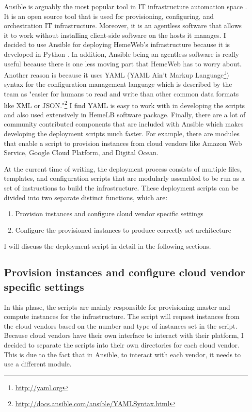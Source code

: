 Ansible is arguably the most popular tool in IT infrastructure automation space \citep{mohaan2014learning}. It is an open source tool that is used for provisioning, configuring, and orchestration IT infrastructure. Moreover, it is an agentless software that allows it to work without installing client-side software on the hosts it manages. I decided to use Ansible for deploying HemeWeb's infrastructure because it is developed in Python \citep{mohaan2014learning}. In addition, Ansible being an agentless software is really useful because there is one less moving part that HemeWeb has to worry about. Another reason is because it uses YAML (YAML Ain't Markup Language\footnote{\url{http://yaml.org}}) syntax for the configuration management language which is described by the team as "easier for humans to read and write than other common data formats like XML or JSON."\footnote{\url{http://docs.ansible.com/ansible/YAMLSyntax.html}} I find YAML is easy to work with in developing the scripts and also used extensively in HemeLB software package.  Finally, there are a lot of community contributed components that are included with Ansible which makes developing the deployment scripts much faster. For example, there are modules that enable a script to provision instances from cloud vendors like Amazon Web Service, Google Cloud Platform, and Digital Ocean.  




At the current time of writing, the deployment process consists of multiple files, templates, and configuration scripts that are modularly assembled to be run as a set of instructions to build the infrastructure. These deployment scripts can be divided into two separate distinct functions, which are:

\begin{enumerate}
\item Provision instances and configure cloud vendor specific settings
\item Configure the provisioned instances to produce correctly set architecture
\end{enumerate}

I will discuss the deployment script in detail in the following sections.


\subsection{Provision instances and configure cloud vendor specific settings}

In this phase, the scripts are mainly responsible for provisioning master and compute instances for the infrastructure. The script will request instances from the cloud vendors based on the number and type of instances set in the script. Because cloud vendors have their own interface to interact with their platform, I decided to separate the scripts into their own directories for each cloud vendor. This is due to the fact that in Ansible, to interact with each vendor, it needs to use a different module.

